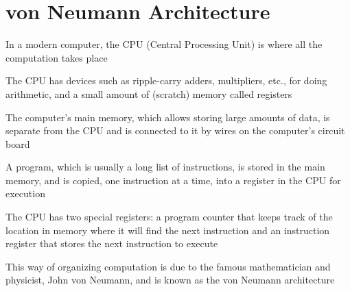 \documentclass[8pt,a4paper,compress]{beamer}
\begin{document}
\section{von Neumann Architecture}
\begin{frame}[fragile]
\pause

In a modern computer, the CPU (Central Processing Unit) is where all the computation takes place

\pause
\bigskip

The CPU has devices such as ripple-carry adders, multipliers, etc., for doing arithmetic, and a small amount of (scratch) memory called registers

\pause
\bigskip

The computer's main memory, which allows storing large amounts of data, is separate from the CPU and is connected to it by wires on the computer's circuit board

\pause
\bigskip

A program, which is usually a long list of instructions, is stored in the main memory, and is copied, one instruction at a time, into a register in the CPU for execution

\pause
\bigskip

The CPU has two special registers: a program counter that keeps track of the location in memory where it will find the next instruction and an instruction register that stores the next instruction to execute

\pause
\bigskip

This way of organizing computation is due to the famous mathematician and physicist, John von Neumann, and is known as the von Neumann architecture
\end{frame}
\end{document}
